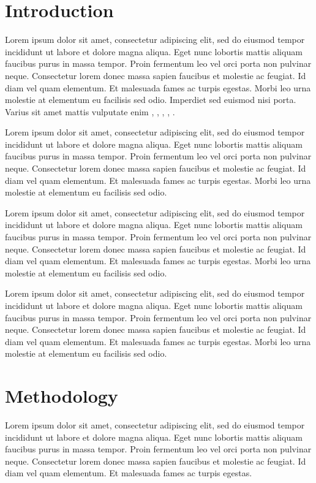 \documentclass{article}
\begin{document}
\section{Introduction}

Lorem ipsum dolor sit amet, consectetur adipiscing elit, sed do eiusmod tempor incididunt ut labore et dolore magna aliqua. Eget nunc lobortis mattis aliquam faucibus purus in massa tempor. Proin fermentum leo vel orci porta non pulvinar neque. Consectetur lorem donec massa sapien faucibus et molestie ac feugiat. Id diam vel quam elementum. Et malesuada fames ac turpis egestas. Morbi leo urna molestie at elementum eu facilisis sed odio. Imperdiet sed euismod nisi porta. Varius sit amet mattis vulputate enim \cite{1_}, \cite{2_}, \cite{3_}, \cite{4_}, \cite{5_}.

Lorem ipsum dolor sit amet, consectetur adipiscing elit, sed do eiusmod tempor incididunt ut labore et dolore magna aliqua. Eget nunc lobortis mattis aliquam faucibus purus in massa tempor. Proin fermentum leo vel orci porta non pulvinar neque. Consectetur lorem donec massa sapien faucibus et molestie ac feugiat. Id diam vel quam elementum. Et malesuada fames ac turpis egestas. Morbi leo urna molestie at elementum eu facilisis sed odio.

Lorem ipsum dolor sit amet, consectetur adipiscing elit, sed do eiusmod tempor incididunt ut labore et dolore magna aliqua. Eget nunc lobortis mattis aliquam faucibus purus in massa tempor. Proin fermentum leo vel orci porta non pulvinar neque. Consectetur lorem donec massa sapien faucibus et molestie ac feugiat. Id diam vel quam elementum. Et malesuada fames ac turpis egestas. Morbi leo urna molestie at elementum eu facilisis sed odio.

Lorem ipsum dolor sit amet, consectetur adipiscing elit, sed do eiusmod tempor incididunt ut labore et dolore magna aliqua. Eget nunc lobortis mattis aliquam faucibus purus in massa tempor. Proin fermentum leo vel orci porta non pulvinar neque. Consectetur lorem donec massa sapien faucibus et molestie ac feugiat. Id diam vel quam elementum. Et malesuada fames ac turpis egestas. Morbi leo urna molestie at elementum eu facilisis sed odio.



\section{Methodology}

Lorem ipsum dolor sit amet, consectetur adipiscing elit, sed do eiusmod tempor incididunt ut labore et dolore magna aliqua. Eget nunc lobortis mattis aliquam faucibus purus in massa tempor. Proin fermentum leo vel orci porta non pulvinar neque. Consectetur lorem donec massa sapien faucibus et molestie ac feugiat. Id diam vel quam elementum. Et malesuada fames ac turpis egestas.
\end{document}
